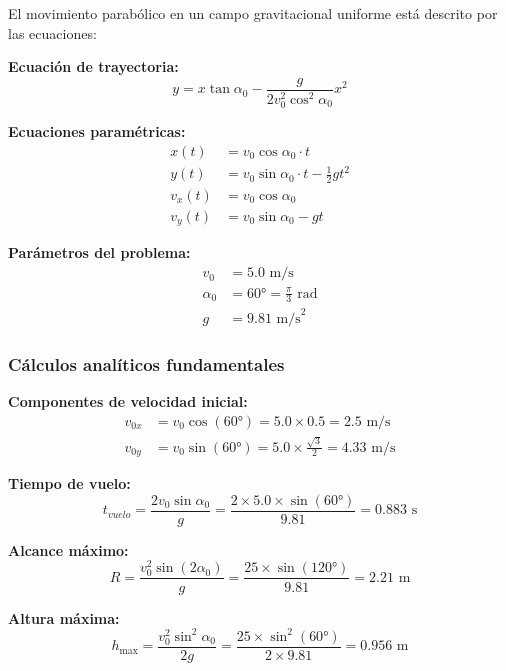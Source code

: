 \documentclass{article}
\begin{document}
\begin{center}
	El movimiento parabólico en un campo gravitacional uniforme está descrito por las ecuaciones:
	
	\textbf{Ecuación de trayectoria:}
	\begin{equation}
		y = x \tan \alpha_0 - \frac{g}{2v_0^2 \cos^2 \alpha_0} x^2
		\label{eq:trayectoria}
	\end{equation}
	
	\textbf{Ecuaciones paramétricas:}
	\begin{align}
		x(t) &= v_0 \cos \alpha_0 \cdot t \\
		y(t) &= v_0 \sin \alpha_0 \cdot t - \frac{1}{2}gt^2 \\
		v_x(t) &= v_0 \cos \alpha_0 \\
		v_y(t) &= v_0 \sin \alpha_0 - gt
	\end{align}
	
	\textbf{Parámetros del problema:}
	\begin{align}
		v_0 &= 5.0 \text{ m/s} \\
		\alpha_0 &= 60° = \frac{\pi}{3} \text{ rad} \\
		g &= 9.81 \text{ m/s}^2
	\end{align}
	
	\subsubsection{Cálculos analíticos fundamentales}
	
	\textbf{Componentes de velocidad inicial:}
	\begin{align}
		v_{0x} &= v_0 \cos(60°) = 5.0 \times 0.5 = 2.5 \text{ m/s} \\
		v_{0y} &= v_0 \sin(60°) = 5.0 \times \frac{\sqrt{3}}{2} = 4.33 \text{ m/s}
	\end{align}
	
	\textbf{Tiempo de vuelo:}
	\begin{equation}
		t_{vuelo} = \frac{2v_0 \sin \alpha_0}{g} = \frac{2 \times 5.0 \times \sin(60°)}{9.81} = 0.883 \text{ s}
	\end{equation}
	
	\textbf{Alcance máximo:}
	\begin{equation}
		R = \frac{v_0^2 \sin(2\alpha_0)}{g} = \frac{25 \times \sin(120°)}{9.81} = 2.21 \text{ m}
	\end{equation}
	
	\textbf{Altura máxima:}
	\begin{equation}
		h_{\max} = \frac{v_0^2 \sin^2 \alpha_0}{2g} = \frac{25 \times \sin^2(60°)}{2 \times 9.81} = 0.956 \text{ m}
	\end{equation}
	

\end{center}
\end{document}
